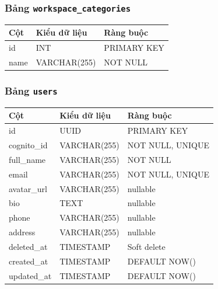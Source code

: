 \subsubsection*{Bảng \texttt{workspace\_categories}}
\begin{table}[H]
\centering
\begin{tabularx}{\textwidth}{|l|l|X|}
\hline
\rowcolor{gray!20}
\textbf{Cột} & \textbf{Kiểu dữ liệu} & \textbf{Ràng buộc} \\
\hline
id & INT & PRIMARY KEY \\
\hline
name & VARCHAR(255) & NOT NULL \\
\hline
\end{tabularx}
\end{table}

\subsubsection*{Bảng \texttt{users}}
\begin{table}[H]
\centering
\begin{tabularx}{\textwidth}{|l|l|X|}
\hline
\rowcolor{gray!20}
\textbf{Cột} & \textbf{Kiểu dữ liệu} & \textbf{Ràng buộc} \\
\hline
id & UUID & PRIMARY KEY \\
\hline
cognito\_id & VARCHAR(255) & NOT NULL, UNIQUE \\
\hline
full\_name & VARCHAR(255) & NOT NULL \\
\hline
email & VARCHAR(255) & NOT NULL, UNIQUE \\
\hline
avatar\_url & VARCHAR(255) & nullable \\
\hline
bio & TEXT & nullable \\
\hline
phone & VARCHAR(255) & nullable \\
\hline
address & VARCHAR(255) & nullable \\
\hline
deleted\_at & TIMESTAMP & Soft delete \\
\hline
created\_at & TIMESTAMP & DEFAULT NOW() \\
\hline
updated\_at & TIMESTAMP & DEFAULT NOW() \\
\hline
\end{tabularx}
\end{table}

